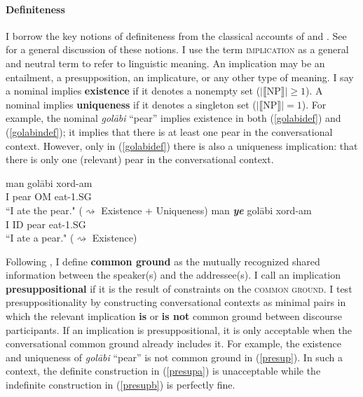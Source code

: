 \documentclass[12pt]{article}
\begin{document}
\paragraph{Definiteness} I borrow the key notions of definiteness from the classical accounts of \cite{russell1905denoting} and \cite{strawson1950referring}. See \cite{abbott2006definite} for a general discussion of these notions. I use the term \textsc {implication} as a general and neutral term to refer to linguistic meaning. An implication may be an entailment, a presupposition, an implicature, or any other type of meaning. I say a nominal implies \textbf{existence} if it denotes a nonempty set ($|\llbracket$NP$\rrbracket| \geq 1$).  A nominal implies \textbf{uniqueness} if it denotes a singleton set ($|\llbracket$NP$\rrbracket| = 1$). For example, the nominal \emph{gol\={a}bi} ``pear'' implies existence in both (\ref{golabidef}) and (\ref{golabindef}); it implies that there is at least one pear in the conversational context. However, only in (\ref{golabidef}) there is also a uniqueness implication: that there is only one (relevant) pear in the conversational context. 

	\begin {exe}
		\ex \begin {xlist}
    		\ex \label{golabidef}	\gll 	man		gol\={a}bi  xord-am\\
    				I		pear {\scriptsize OM} eat-{\scriptsize 1.SG}\\
    			\glt 	``I ate the pear." ($\rightsquigarrow$ Existence + Uniqueness)
    		\ex \label {golabindef}	\gll 	man	{\color{red}\emph {\textbf {ye}}}	gol\={a}bi	xord-am\\
    				I	{\scriptsize ID}	pear	eat-{\scriptsize 1.SG}\\
    			\glt 	``I ate a pear." ($\rightsquigarrow$ Existence)
		\end {xlist}
	\end {exe}

Following \cite{stalnaker78}, I define \textbf{common ground} as the mutually recognized shared information between the speaker(s) and the addressee(s). I call an implication \textbf{presuppositional} if it is the result of constraints on the \textsc{common ground}. I test presuppositionality by constructing conversational contexts as minimal pairs in which the relevant implication \textbf{is} or \textbf{is not} common ground between discourse participants. If an implication is presuppositional, it is only acceptable when the conversational common ground already includes it. For example, the existence and uniqueness of \emph{gol\={a}bi} ``pear'' is not common ground in (\ref{presup}). In such a context, the definite construction in (\ref{presupa}) is unacceptable while the indefinite construction in (\ref{presupb}) is perfectly fine. 
\end{document}

